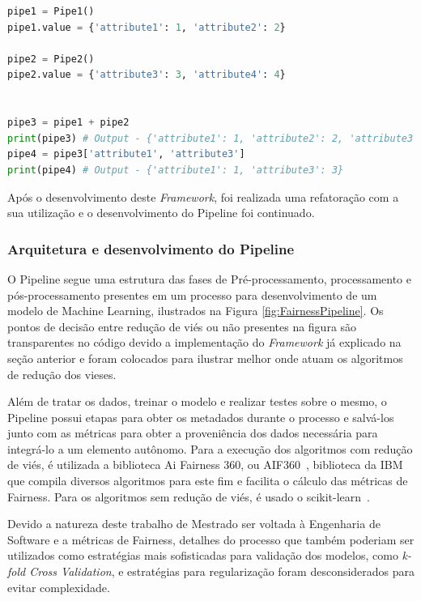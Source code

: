 \documentclass[portugues]{ic-tese}
\begin{document}
\begin{lstlisting}[language=Python, caption=Manipulações para Pipes com métodos especiais,label=cod:PipeAndFilterManipulationSpecial]
pipe1 = Pipe1()
pipe1.value = {'attribute1': 1, 'attribute2': 2}

pipe2 = Pipe2()
pipe2.value = {'attribute3': 3, 'attribute4': 4}


pipe3 = pipe1 + pipe2
print(pipe3) # Output - {'attribute1': 1, 'attribute2': 2, 'attribute3': 3, 'attribute4': 4}
pipe4 = pipe3['attribute1', 'attribute3']
print(pipe4) # Output - {'attribute1': 1, 'attribute3': 3}
\end{lstlisting}

Após o desenvolvimento deste \textit{Framework}, foi realizada uma refatoração com a sua utilização e o desenvolvimento do Pipeline foi continuado.

\subsubsection{Arquitetura e desenvolvimento do Pipeline}

O Pipeline segue uma estrutura das fases de Pré-processamento, processamento e pós-processamento presentes em um processo para desenvolvimento de um modelo de Machine Learning, ilustrados na Figura \ref{fig:FairnessPipeline}. Os pontos de decisão entre redução de viés ou não presentes na figura são transparentes no código devido a implementação do \textit{Framework} já explicado na seção anterior e foram colocados para ilustrar melhor onde atuam os algoritmos de redução dos vieses.

Além de tratar os dados, treinar o modelo e realizar testes sobre o mesmo, o Pipeline possui etapas para obter os metadados durante o processo e salvá-los junto com as métricas para obter a proveniência dos dados necessária para integrá-lo a um elemento autônomo. Para a execução dos algoritmos com redução de viés, é utilizada a biblioteca Ai Fairness 360, ou AIF360~\citep{AIF360_2022}, biblioteca da IBM que compila diversos algoritmos para este fim e facilita o cálculo das métricas de Fairness. Para os algoritmos sem redução de viés, é usado o scikit-learn~\citep{scikit_2022}.

Devido a natureza deste trabalho de Mestrado ser voltada à Engenharia de Software e a métricas de Fairness, detalhes do processo que também poderiam ser utilizados como estratégias mais sofisticadas para validação dos modelos, como \textit{k-fold Cross Validation}, e estratégias para regularização foram desconsiderados para evitar complexidade.
\end{document}
